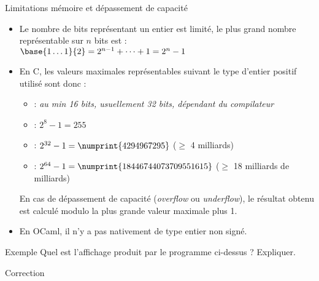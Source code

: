 \documentclass[10pt]{beamer}
\begin{document}
\begin{frame}{\Ctitle}{\stitle}
    \begin{block}{Limitations mémoire et dépassement de capacité}
        \begin{itemize}
        \item<1-> Le nombre de bits représentant un entier est limité, le plus grand nombre représentable sur $n$ bits est : \\
        $\base{1\dots1}{2} = 2^{n-1} + \dots + 1 = 2^{n}-1$
        \item<2-> En C, les valeurs maximales représentables suivant le type d'entier positif utilisé sont donc :
        \begin{itemize}
            \item<2->  : \textit{au min 16 bits, usuellement 32 bits, dépendant du compilateur}
            \item<3->  : $2^8-1 = 255$
            \item<4->   : $2^{32}-1 = \numprint{4294967295}$ ($\geq$ 4 milliards)
            \item<5->   : $2^{64}-1 = \numprint{18446744073709551615}$ ($\geq$ 18 milliards de milliards)
        \end{itemize}
         En cas de dépassement de capacité (\textit{overflow} ou \textit{underflow}),  le résultat obtenu est calculé modulo la plus grande valeur maximale plus 1.\\
        \item<5-> En OCaml, il n'y a pas nativement de type entier non signé.
    \end{itemize}
    \end{block}
\end{frame}

\begin{frame}[fragile]{\Ctitle}{\stitle}
    \begin{exampleblock}{Exemple}
        Quel est l'affichage produit par le programme ci-dessus ? Expliquer.
    \end{exampleblock}
\end{frame}

\begin{frame}[fragile]{\Ctitle}{\stitle}
    \begin{exampleblock}{Correction}
    \end{exampleblock}
\end{frame}
\end{document}
